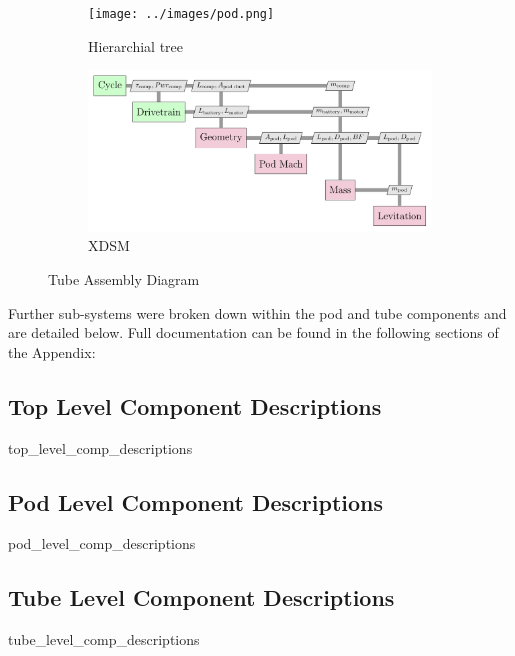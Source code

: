 \begin{figure}
\centering
\begin{subfigure}{.5\textwidth}
  \centering
  \texttt{[image: ../images/pod.png]}
  \caption{Hierarchial tree}
  \label{fig:tree:pod}
\end{subfigure}%
\begin{subfigure}{.5\textwidth}
  \centering
  \includegraphics{../images/xdsm/pod.pdf}
  \caption{XDSM}
  \label{fig:xdsm:pod}
\end{subfigure}
\caption{Tube Assembly Diagram}
\label{fig:pod}
\end{figure}

Further sub-systems were broken down within the pod and tube components and are detailed below.
Full documentation can be found in the following sections of the Appendix:

\subsection{Top Level Component Descriptions}
	{top_level_comp_descriptions}
\subsection{Pod Level Component Descriptions}
	{pod_level_comp_descriptions}
\subsection{Tube Level Component Descriptions}
	{tube_level_comp_descriptions}


